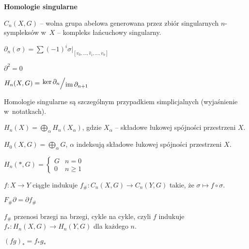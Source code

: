 {\bf Homologie singularne}

\begin{definicja}
	$C_n(X,G)$ -- wolna grupa abelowa generowana przez 
	zbiór singularnych $n$-sympleksów w~$X$ 
	-- kompleks łańcuchowy singularny.
	
	$\partial_n(\sigma) 
	= \sum(-1)^i \sigma|_{[v_0, \ldots, \hat{v}_i, \ldots, v_n]}$
	
	$\partial^2 = 0$
	
	$H_n(X,G) = \bigslant{\ker \partial_n}{\im \partial_{n+1}}$
\end{definicja}

\begin{uwaga}
	Homologie singularne są szczególnym przypadkiem simplicjalnych
	(wyjaśnienie w~notatkach).
\end{uwaga}

\begin{stwierdzenie}
	$H_n(X) = \bigoplus_\alpha H_n(X_\alpha)$, 
	gdzie $X_\alpha$ -- składowe łukowej spójności przestrzeni $X$.
\end{stwierdzenie}

\begin{stwierdzenie}
	$H_0(X,G) = \bigoplus_\alpha G$, 
	$\alpha$ indeksują składowe łukowej spójności przestrzeni $X$.
\end{stwierdzenie}

\begin{stwierdzenie}
	$H_n(\ast, G) = \begin{cases} G & n = 0 \\ 0 & n \geq 1 \end{cases}$
\end{stwierdzenie}

\begin{definicja}
	$f:X \to Y$ ciągłe indukuje ${f_\# : C_n(X,G) \to C_n(Y,G)}$
	takie, że $\sigma \mapsto f \circ \sigma$.
\end{definicja}

\begin{lemat}
	$F_\# \partial = \partial f_\#$
\end{lemat}

\begin{wniosek}
	$f_\#$ przenosi brzegi na brzegi, cykle na cykle, czyli
	$f$ indukuje ${f_\ast : H_n(X,G) \to H_n(Y,G)}$ dla każdego $n$.
\end{wniosek}

\begin{fakt}
	$(fg)_\ast = f_\ast g_\ast$
\end{fakt}

